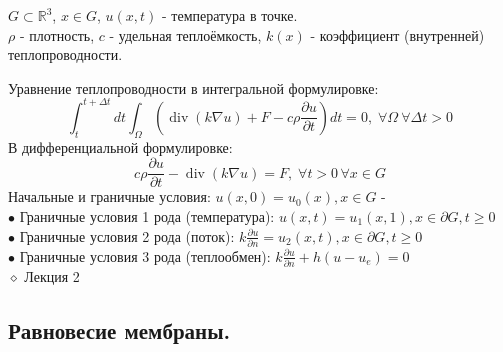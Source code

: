 \documentclass{article}
\begin{document}
$G \subset \mathbb{R}^3$, $x \in G$, $u(x,t)$ - температура в точке. \\
$\rho$ - плотность, $c$ - удельная теплоёмкость, $k(x)$ - коэффициент (внутренней) теплопроводности. \\
\vspace{14}

Уравнение теплопроводности в интегральной формулировке:
$$
\int_{t}^{t+\Delta t} dt \int_{\Omega} (\operatorname{div}(k \nabla u) + F - c \rho \frac{\partial u}{\partial t}) dt = 0,\; \forall \Omega \ \forall \Delta t > 0
$$
В дифференциальной формулировке:
$$
c\rho \frac{\partial u}{\partial t} - \operatorname{div}(k \nabla u) = F,\; \forall t > 0 \, \forall x \in G
$$
Начальные и граничные условия:
$u(x, 0) = u_0(x), x \in G$ -  \\
$\bullet$ Граничные условия 1 рода (температура): $u(x,t) = u_1(x,1), x \in \partial G, t \ge 0 $\\
$\bullet$ Граничные условия 2 рода (поток): $k \frac{\partial u}{\partial n} = u_2(x,t), x \in \partial G, t \ge 0 $\\
$\bullet$ Граничные условия 3 рода (теплообмен): $k \frac{\partial u}{\partial n} + h(u - u_e) = 0$ \\
\vspace{14}
$\diamond$ Лекция 2

\subsection{Равновесие мембраны.}
\end{document}
